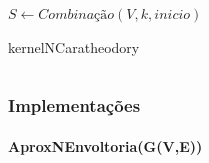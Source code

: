\begin{frame}
\begin{columns}[T]
\begin{column}{.5\textwidth}
\begin{algorithm}[H]
{            $S \gets Combinação(V, k, inicio)$\\
             \BlankLine
        }
        \caption{kernelNCaratheodory}
        \end{algorithm}
    \end{column}
  \end{columns}
\end{frame}

\begin{frame}
\frametitle{Implementações}
\framesubtitle{AproxNEnvoltoria(G(V,E))}
  \begin{columns}[T]
    \begin{column}{.5\textwidth}
    \begin{algorithm}[H]
        \label{alg:aproximativo-numero-envoltoria-p3}
        \SetAlFnt{\tiny}
        \SetAlCapFnt{\small}
        \SetAlCapNameFnt{\small}
        \SetAlgoLined
        \DontPrintSemicolon
        \LinesNumbered
        \SetAlgoLined
        \BlankLine
        \BlankLine


\end{algorithm}
\end{column}
\end{columns}
\end{frame}
